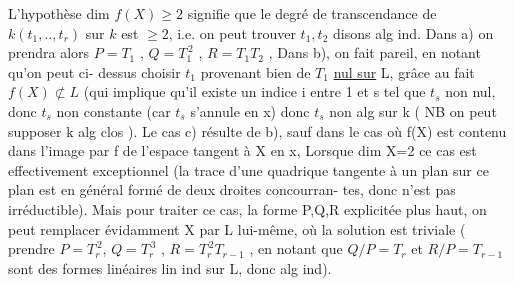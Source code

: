 
L'hypothèse  dim $f(X)\geqslant 2$  signifie que  le degré de transcendance de
$k(t_1,..,t_r)$ sur $k$  est $\geqslant 2$, i.e. on peut trouver  $t_1,t_2$ disons alg ind.
Dans a) on prendra alors   $P = T_1$ , $Q = T_1^{\,2}$ , $R = T_1T_2$ , Dans b), on
fait pareil,  en notant qu'on peut ci-%
dessus choisir $t_1$ provenant bien de $T_1$ \uline{nul sur} L, grâce au fait $f(X)\not\subset L$
(qui implique qu'il  existe un indice  i  entre 1 et s tel que $t_s$ non
nul, donc $t_s$ non constante (car $t_s$ s'annule en x) donc $t_s$  non alg sur k
( NB on peut supposer k alg clos ).  Le cas c) résulte de b),  sauf dans le cas où  f(X) est contenu dans
l'image  par f de l'espace tangent à X en x,  \hand{[}Lorsque dim X=2
ce cas est effectivement exceptionnel (la trace d'une quadrique tangente
à un plan sur ce plan est en général formé de deux droites concourran-%
tes, donc n'est pas irréductible)\hand{]}. Mais pour traiter ce cas,  la
forme P,Q,R explicitée plus haut, on peut remplacer  évidamment X par
L lui-même, où la solution est triviale ( prendre $P=T_r^{\,2}$, $Q=T_r^{\,3}$ ,
$R = T_r^{\,2}T_{r-1}$ , en notant que  $Q/P = T_r$ et  $R/P = T_{r-1}$ sont des formes
linéaires lin ind sur L, donc alg ind). 

